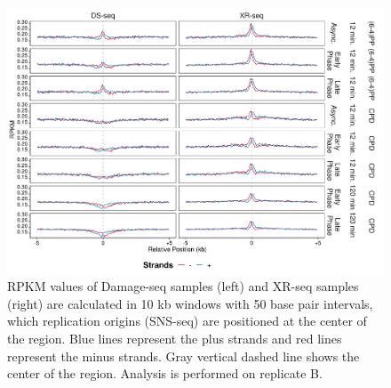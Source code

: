 \begin{figure}[H]
\begin{center}
\includegraphics[width=\textwidth]{Chapters/7_appendix/figures/supfig47}
\caption[Damage and repair events of replication origins in 10 kb (replicate B).]{RPKM values of Damage-seq samples (left) and XR-seq samples (right) are calculated in 10 kb windows with 50 base pair intervals, which replication origins (SNS-seq) are positioned at the center of the region. Blue lines represent the plus strands and red lines represent the minus strands. Gray vertical dashed line shows the center of the region. Analysis is performed on replicate B.}
\label{supfig:rpkm10snsB}
\end{center}
\end{figure}

